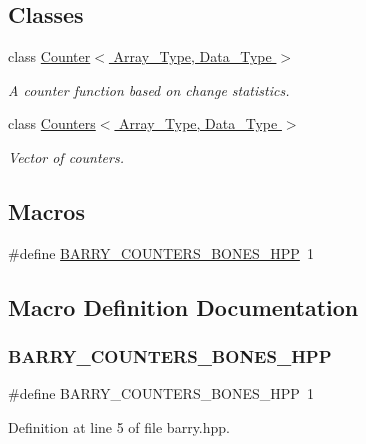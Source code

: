 \subsection*{Classes}
\begin{DoxyCompactItemize}
\item 
class \hyperlink{class_counter}{Counter$<$ Array\+\_\+\+Type, Data\+\_\+\+Type $>$}
\begin{DoxyCompactList}\small\item\em A counter function based on change statistics. \end{DoxyCompactList}\item 
class \hyperlink{class_counters}{Counters$<$ Array\+\_\+\+Type, Data\+\_\+\+Type $>$}
\begin{DoxyCompactList}\small\item\em Vector of counters. \end{DoxyCompactList}\end{DoxyCompactItemize}
\subsection*{Macros}
\begin{DoxyCompactItemize}
\item 
\#define \hyperlink{barry_8hpp_a1c3b1727de4f4f5d73e9040b9dd136c1}{B\+A\+R\+R\+Y\+\_\+\+C\+O\+U\+N\+T\+E\+R\+S\+\_\+\+B\+O\+N\+E\+S\+\_\+\+H\+PP}~1
\end{DoxyCompactItemize}


\subsection{Macro Definition Documentation}
\mbox{\label{barry_8hpp_a1c3b1727de4f4f5d73e9040b9dd136c1}} 
\subsubsection{\texorpdfstring{B\+A\+R\+R\+Y\+\_\+\+C\+O\+U\+N\+T\+E\+R\+S\+\_\+\+B\+O\+N\+E\+S\+\_\+\+H\+PP}{BARRY\_COUNTERS\_BONES\_HPP}}
{\footnotesize\ttfamily \#define B\+A\+R\+R\+Y\+\_\+\+C\+O\+U\+N\+T\+E\+R\+S\+\_\+\+B\+O\+N\+E\+S\+\_\+\+H\+PP~1}



Definition at line 5 of file barry.\+hpp.

